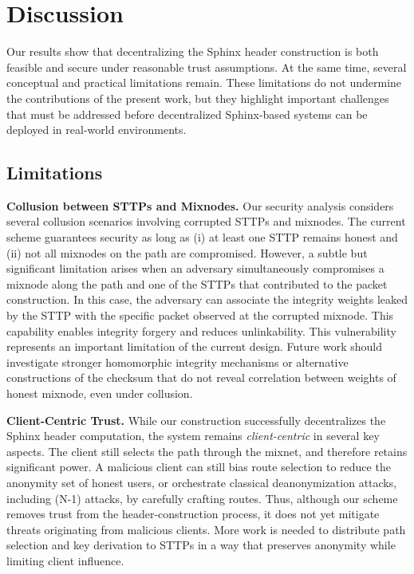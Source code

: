 \section{Discussion} %

Our results show that decentralizing the Sphinx header construction is both feasible and secure under reasonable trust assumptions.  
At the same time, several conceptual and practical limitations remain.  
These limitations do not undermine the contributions of the present work, but they highlight important challenges that must be addressed before decentralized Sphinx-based systems can be deployed in real-world environments.

\subsection{Limitations}

\noindent\textbf{Collusion between STTPs and Mixnodes.} 
Our security analysis considers several collusion scenarios involving corrupted STTPs and mixnodes.  
The current scheme guarantees security as long as (i) at least one STTP remains honest and (ii) not all mixnodes on the path are compromised.  
However, a subtle but significant limitation arises when an adversary simultaneously compromises a mixnode along the path and one of the STTPs that contributed to the packet construction.  
In this case, the adversary can associate the integrity weights leaked by the STTP with the specific packet observed at the corrupted mixnode.  
This capability enables integrity forgery and reduces unlinkability.  
This vulnerability represents an important limitation of the current design.  
Future work should investigate stronger homomorphic integrity mechanisms or alternative constructions of the checksum that do not reveal correlation between weights of honest mixnode, even under collusion.

\noindent\textbf{Client-Centric Trust.} 
While our construction successfully decentralizes the Sphinx header computation, the system remains \emph{client-centric} in several key aspects.  
The client still selects the path through the mixnet, and therefore retains significant power.  
A malicious client can still bias route selection to reduce the anonymity set of honest users, or orchestrate classical deanonymization attacks, including (N-1) attacks, by carefully crafting routes.  
Thus, although our scheme removes trust from the header-construction process, it does not yet mitigate threats originating from malicious clients.  
More work is needed to distribute path selection and key derivation to STTPs in a way that preserves anonymity while limiting client influence.

